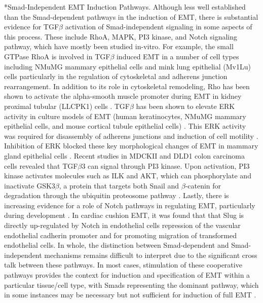 \documentclass[12pt]{article}
\makeatletter
\renewcommand\subsubsection{\@startsection
	{subsubsection}{2}{0mm}
	{-0.05in}
	{-0.5\baselineskip}
	{\normalfont\normalsize\itshape}}
\makeatother
\begin{document}
\subsubsection*{Smad-Independent EMT Induction Pathways. }Although less well established than the Smad-dependent pathways in the induction of EMT, there is substantial evidence for TGF$\beta$ activation of Smad-independent signaling in some aspects of this process.
These include RhoA, MAPK, PI3 kinase, and Notch signaling pathway, which have mostly been studied in-vitro.
For example, the small GTPase RhoA is involved in TGF$\beta$ induced EMT in a number of cell types including NMuMG mammary epithelial cells and mink lung epithelial (Mv1Lu) cells particularly in the regulation of cytoskeletal and adherens junction rearrangement.
In addition to its role in cytoskeletal remodeling, Rho has been shown to activate the alpha-smooth muscle promoter during EMT in kidney proximal tubular (LLCPK1) cells \cite{Masszi:2003hb}.
TGF$\beta$ has been shown to elevate ERK activity in culture models of EMT (human keratinocytes, NMuMG mammary epithelial cells, and mouse cortical tubule epithelial cells) \cite{Zavadil2001,Xie2004,Davies2005}.
This ERK activity was required for disassembly of adherens junctions and induction of cell motility \cite{Xie2004}.
Inhibition of ERK blocked these key morphological changes of EMT in mammary gland epithelial cells \cite{Xie2003}.
Recent studies in MDCKII and DLD1 colon carcinoma cells revealed that TGF$\beta$3 can signal through PI3 kinase.
Upon activation, PI3 kinase activates molecules such as ILK and AKT, which can phosphorylate and inactivate GSK3$\beta$, a protein that targets both Snail and $\beta$-catenin for degradation through the ubiquitin proteosome pathway \cite{Medici:2008fk}.
Lastly, there is increasing evidence for a role of Notch pathways in regulating EMT, particularly during development \cite{Nawshad:2005pi}.
In cardiac cushion EMT, it was found that that Slug is directly up-regulated by Notch in endothelial cells repression of the vascular endothelial cadherin promoter and for promoting migration of transformed endothelial cells.
In whole, the distinction between Smad-dependent and Smad-independent mechanisms remains difficult to interpret due to the significant cross talk between these pathways.
In most cases, stimulation of these cooperative pathways provides the context for induction and specification of EMT within a particular tissue/cell type, with Smads representing the dominant pathway, which in some instances may be necessary but not sufficient for induction of full EMT \cite{Zavadil:2005fu}.
\end{document}
